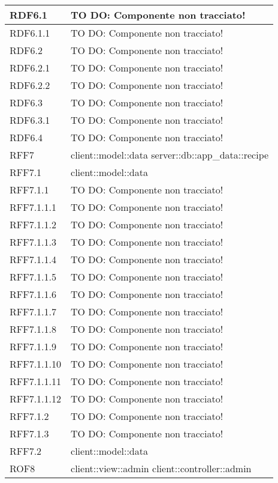 \begin{center}
\begin{longtable}{| p{4cm} | p{8cm} |}
\hline
RDF6.1 & TO DO: Componente non tracciato! \\
\hline
RDF6.1.1 & TO DO: Componente non tracciato! \\
\hline
RDF6.2 & TO DO: Componente non tracciato! \\
\hline
RDF6.2.1 & TO DO: Componente non tracciato! \\
\hline
RDF6.2.2 & TO DO: Componente non tracciato! \\
\hline
RDF6.3 & TO DO: Componente non tracciato! \\
\hline
RDF6.3.1 & TO DO: Componente non tracciato! \\
\hline
RDF6.4 & TO DO: Componente non tracciato! \\
\hline
RFF7 & client::model::data \newline server::db::app\_data::recipe \\
\hline
RFF7.1 & client::model::data \\
\hline
RFF7.1.1 & TO DO: Componente non tracciato! \\
\hline
RFF7.1.1.1 & TO DO: Componente non tracciato! \\
\hline
RFF7.1.1.2 & TO DO: Componente non tracciato! \\
\hline
RFF7.1.1.3 & TO DO: Componente non tracciato! \\
\hline
RFF7.1.1.4 & TO DO: Componente non tracciato! \\
\hline
RFF7.1.1.5 & TO DO: Componente non tracciato! \\
\hline
RFF7.1.1.6 & TO DO: Componente non tracciato! \\
\hline
RFF7.1.1.7 & TO DO: Componente non tracciato! \\
\hline
RFF7.1.1.8 & TO DO: Componente non tracciato! \\
\hline
RFF7.1.1.9 & TO DO: Componente non tracciato! \\
\hline
RFF7.1.1.10 & TO DO: Componente non tracciato! \\
\hline
RFF7.1.1.11 & TO DO: Componente non tracciato! \\
\hline
RFF7.1.1.12 & TO DO: Componente non tracciato! \\
\hline
RFF7.1.2 & TO DO: Componente non tracciato! \\
\hline
RFF7.1.3 & TO DO: Componente non tracciato! \\
\hline
RFF7.2 & client::model::data \\
\hline
ROF8 & client::view::admin \newline client::controller::admin \\

\end{longtable}
\end{center}
